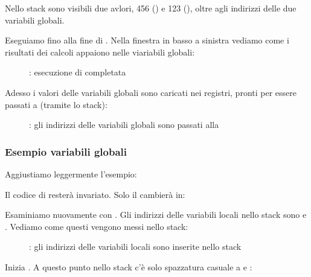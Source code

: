 Nello stack sono visibili due avlori, 456 () e
123 (), oltre agli indirizzi delle due variabili globali.

\clearpage

Eseguiamo fino alla fine di \ttfone.
Nella finestra in basso a sinistra vediamo come i risultati dei calcoli appaiono nelle viariabili globali:

\begin{figure}[H]
\centering
{}
\caption{\olly: esecuzione di \ttfone completata}
\label{fig:pointers_olly_global_3}
\end{figure}

\clearpage

Adesso i valori delle variabili globali sono caricati nei registri, pronti per essere passati a \printf (tramite lo stack):

\begin{figure}[H]
\centering
{}
\caption{\olly: 
gli indirizzi  delle variabili globali sono passati alla \printf}
\label{fig:pointers_olly_global_4}
\end{figure}

\subsubsection{Esempio variabili globali}

Aggiustiamo leggermente l'esempio:



Il codice di \ttfone resterà invariato.
Solo il \main cambierà in:



\clearpage
Esaminiamo nuovamente con \olly.
Gli indirizzi delle variabili locali nello stack sono  e .
Vediamo come questi vengono messi nello stack: 

\begin{figure}[H]
\centering
{}
\caption{\olly: gli indirizzi delle variabili locali sono inserite nello stack}
\label{fig:pointers_olly_stk_1}
\end{figure}

\clearpage
Inizia \ttfone.
A questo punto nello stack c'è solo spazzatura casuale a  e :

